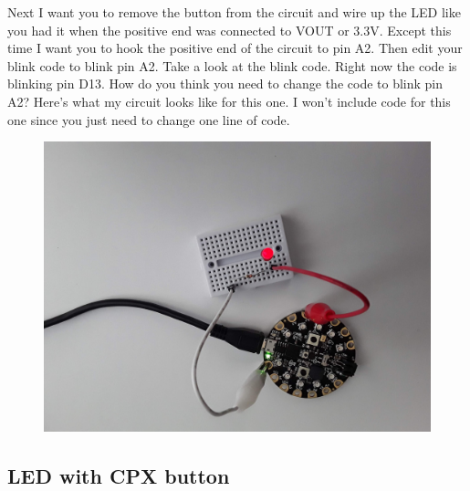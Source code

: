 Next I want you to remove the button from the circuit and wire up the
LED like you had it when the positive end was connected to VOUT or
3.3V. Except this time I want you to hook the positive end of the
circuit to pin A2. Then edit your blink code to blink pin A2. Take
a look at the blink 
code. Right now the code is blinking pin D13. How do you think you
need to change the code to blink pin A2? Here’s what my circuit looks
like for this one. I won’t include code for this one since you just
need to change one line of code.
\begin{figure}[H]
  \begin{center}
    \includegraphics[width=\textwidth]{Figures/LED4.jpeg}
  \end{center}
\end{figure}

\subsection{LED with CPX button}

